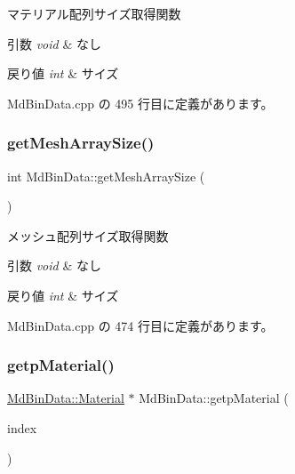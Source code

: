 マテリアル配列サイズ取得関数 


\begin{DoxyParams}{引数}
{\em void} & なし \\
\hline
\end{DoxyParams}

\begin{DoxyRetVals}{戻り値}
{\em int} & サイズ \\
\hline
\end{DoxyRetVals}


 Md\+Bin\+Data.\+cpp の 495 行目に定義があります。

\mbox{\label{class_md_bin_data_a6aa476ad1bb36532609cf344d68a53d8}} 
\subsubsection{\texorpdfstring{get\+Mesh\+Array\+Size()}{getMeshArraySize()}}
{\footnotesize\ttfamily int Md\+Bin\+Data\+::get\+Mesh\+Array\+Size (\begin{DoxyParamCaption}{ }\end{DoxyParamCaption})}



メッシュ配列サイズ取得関数 


\begin{DoxyParams}{引数}
{\em void} & なし \\
\hline
\end{DoxyParams}

\begin{DoxyRetVals}{戻り値}
{\em int} & サイズ \\
\hline
\end{DoxyRetVals}


 Md\+Bin\+Data.\+cpp の 474 行目に定義があります。

\mbox{\label{class_md_bin_data_a10bca66286683a1031fc64307866270a}} 
\subsubsection{\texorpdfstring{getp\+Material()}{getpMaterial()}}
{\footnotesize\ttfamily \mbox{\hyperlink{class_md_bin_data_1_1_material}{Md\+Bin\+Data\+::\+Material}} $\ast$ Md\+Bin\+Data\+::getp\+Material (\begin{DoxyParamCaption}\item[{int}]{index }\end{DoxyParamCaption})}



